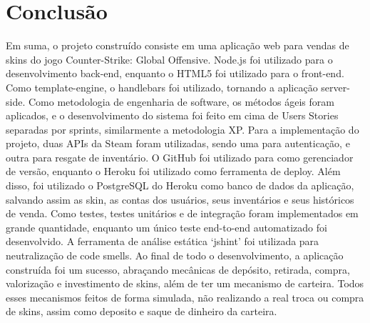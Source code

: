 \chapter*[Conclusão]{Conclusão}
Em suma, o projeto construído consiste em uma aplicação web para vendas de skins do jogo 
Counter-Strike: Global Offensive. Node.js foi utilizado para o desenvolvimento back-end,
enquanto o HTML5 foi utilizado para o front-end. Como template-engine, o handlebars foi 
utilizado, tornando a aplicação server-side.
Como metodologia de engenharia de software, os métodos ágeis foram aplicados, e o 
desenvolvimento do sistema foi feito em cima de Users Stories separadas por sprints, 
similarmente a metodologia XP.  
Para a implementação do projeto, duas APIs da Steam foram utilizadas, sendo uma para 
autenticação, e outra para resgate de inventário. O GitHub foi utilizado para como 
gerenciador de versão, enquanto o Heroku foi utilizado como ferramenta de deploy.
Além disso, foi utilizado o PostgreSQL do Heroku como banco de dados da aplicação, salvando 
assim as skin, as contas dos usuários, seus inventários e seus históricos de venda.
Como testes, testes unitários e de integração foram implementados em grande quantidade, 
enquanto um único teste end-to-end automatizado foi desenvolvido. A ferramenta de análise 
estática ‘jshint’ foi utilizada para neutralização de code smells.
Ao final de todo o desenvolvimento, a aplicação construída foi um sucesso, abraçando 
mecânicas de depósito, retirada, compra, valorização e investimento de skins, além de ter um 
mecanismo de carteira. Todos esses mecanismos feitos de forma simulada, não realizando a 
real troca ou compra de skins, assim como deposito e saque de dinheiro da carteira.

